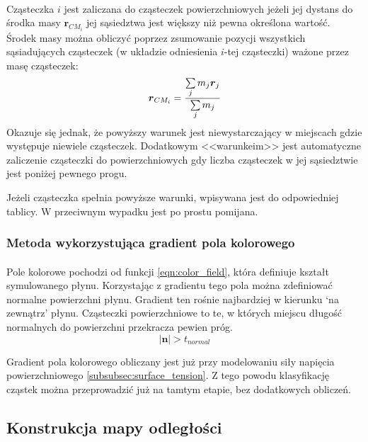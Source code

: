 \paragraph{}
Cząsteczka $i$ jest zaliczana do cząsteczek powierzchniowych jeżeli jej dystans do środka masy $\boldsymbol{r}_{CM_{i}}$ jej sąsiedztwa jest większy niż pewna określona wartość. Środek masy można obliczyć poprzez zsumowanie pozycji wszystkich sąsiadujących cząsteczek (w układzie odniesienia $i$-tej cząsteczki) ważone przez masę cząsteczek:
\begin{equation}
\boldsymbol{r}_{CM_{i}} = {{\sum\limits_{j} {m_j \boldsymbol{r}_{j}}} \over {\sum\limits_{j} {m_j}}}
\label{eqn:center_mass}
\end{equation}
Okazuje się jednak, że powyższy warunek jest niewystarczający w miejscach gdzie występuje niewiele cząsteczek. Dodatkowym <<warunkeim>> jest automatyczne zaliczenie cząsteczki do powierzchniowych gdy liczba cząsteczek w jej sąsiedztwie jest poniżej pewnego progu.
\par
Jeżeli cząsteczka spełnia powyższe warunki, wpisywana jest do odpowiedniej tablicy. W przeciwnym wypadku jest po prostu pomijana.
\par
\subsubsection{Metoda wykorzystująca gradient pola kolorowego}

\paragraph{}
Pole kolorowe pochodzi od funkcji \eqref{eqn:color_field}, która definiuje kształt symulowanego płynu. Korzystając z gradientu tego pola można zdefiniować normalne powierzchni płynu. Gradient ten rośnie najbardziej w kierunku `na zewnątrz' płynu. Cząsteczki powierzchniowe to te, w których miejscu długość normalnych do powierzchni przekracza pewien próg.
\begin{equation}
|\boldsymbol{n}| > t_{normal}
\end{equation}
\par
Gradient pola kolorowego obliczany jest już przy modelowaniu siły napięcia powierzchniowego \eqref{subsubsec:surface_tension}. Z tego powodu klasyfikację cząstek można przeprowadzić już na tamtym etapie, bez dodatkowych obliczeń.
\par

\subsection{Konstrukcja mapy odległości}

